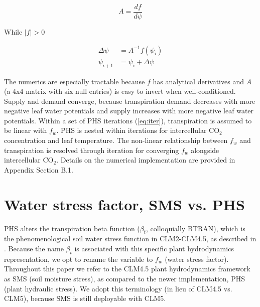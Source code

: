 \documentclass[draft,linenumbers]{agujournal}
\begin{document}
    \begin{linenomath*}
    \begin{equation}
    A = \dfrac{df}{d\psi}
    \end{equation}
    \end{linenomath*}    
    
    While $\left|f\right|>0$
    \begin{linenomath*}
    \begin{equation} \begin{aligned}
    \label{eq:iter}
    \Delta\psi &=A^{-1}f\left(\psi_i\right) \\
    \psi_{i+1}  &= \psi_i + \Delta\psi
    \end{aligned} \end{equation}
    \end{linenomath*}    
    
    The numerics are especially tractable because $f$ has analytical derivatives and $A$ 
    (a 4x4 matrix with six null entries) is easy to invert when well-conditioned. 
    Supply and demand converge, because transpiration demand decreases with more negative 
    leaf water potentials and supply increases with more negative leaf water potentials.
    Within a set of PHS iterations (\ref{eq:iter}), transpiration is assumed to be linear with $f_w$.
    PHS is nested within iterations for intercellular CO$_2$ concentration and leaf temperature.
    The non-linear relationship between $f_w$ and transpiration is resolved through iteration for converging $f_w$ alongside intercellular CO$_2$.
    Details on the numerical implementation are provided in Appendix Section B.1.


\section{Water stress factor, SMS vs. PHS}
\label{sect:btran}
    PHS alters the transpiration beta function ($\beta_t$, colloquially BTRAN), 
    which is the phenomenological soil water stress function in CLM2-CLM4.5, as described in \citet{oleson2013}.
    Because the name $\beta_t$ is associated with this specific plant hydrodynamics representation, we opt to rename the variable to $f_w$ (water stress factor).
    Throughout this paper we refer to the CLM4.5 plant hydrodynamics framework as SMS (soil moisture stress), 
    as compared to the newer implementation, PHS (plant hydraulic stress).
    We adopt this terminology (in lieu of CLM4.5 vs. CLM5), because SMS is still deployable with CLM5. 
    
\end{document}
